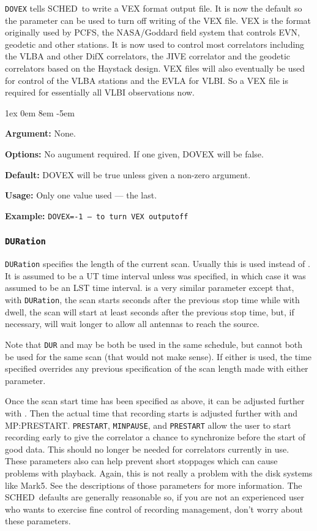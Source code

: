 \documentclass{report}
\newcommand{\schedb}{{\sc SCHED~}}
\newcommand{\rcwbox}[5]{
  \begin{list}{}{\parsep 1ex  \itemsep 0em
                 \leftmargin 8em  \itemindent -5em }
    \item {\bf Argument:} #1
    \item {\bf Options:}  #2
    \item {\bf Default:}  #3
    \item {\bf Usage:}    #4
    \item {\bf Example:}  #5
  \end{list}
}
\begin{document}
{\tt DOVEX} tells \schedb to write a VEX format output file. It is now
the default so the parameter can be used to turn off writing of the
VEX file.  VEX is the format originally used by PCFS, the NASA/Goddard
field system that controls EVN, geodetic and other stations. It is now
used to control most correlators including the VLBA and other DifX
correlators, the JIVE correlator and the geodetic correlators based on
the Haystack design.  VEX files will also eventually be used for
control of the VLBA stations and the EVLA for VLBI.  So a VEX file is
required for essentially all VLBI observations now.


\rcwbox
{None.}
{No augument required.  If one given, DOVEX will be false.}
{DOVEX will be true unless given a non-zero argument.}
{Only one value used --- the last.}
{{\tt DOVEX=-1 --- to turn VEX outputoff}}


\subsubsection{\label{MP:DUR}{\tt DURation}}

{\tt DURation} specifies the length of the current scan. Usually this
is used instead of . It is assumed to be
a UT time interval unless  was specified,
in which case it was assumed to be an LST time interval.
 is a very similar parameter except
that, with {\tt DURation}, the scan starts 
seconds after the previous stop time while with dwell, the scan will
start at least  seconds after the previous
stop time, but, if necessary, will wait longer to allow all antennas to
reach the source.

Note that {\tt DUR} and 
may be both be used in the same schedule, but cannot both be used
for the same scan (that would not make sense).  If either is used,
the time specified overrides any previous specification of the
scan length made with either parameter.

Once the scan start time has been specified as above, it can be
adjusted further with .  Then the
actual time that recording starts is adjusted further with
 and 
{MP:PRESTART}.  {\tt PRESTART}, {\tt MINPAUSE}, and {\tt PRESTART}
allow the user to start recording early to give the correlator
a chance to synchronize before the start of good data.  This should no
longer be needed for correlators currently in use.  These parameters also
can help prevent short stoppages which can cause problems
with playback. Again, this is not really a problem with the disk
systems like Mark5.   See the descriptions of those parameters for more
information.  The \schedb defaults are generally reasonable so, if
you are not an experienced user who wants to exercise fine control
of recording management, don't worry about these parameters.
\end{document}

